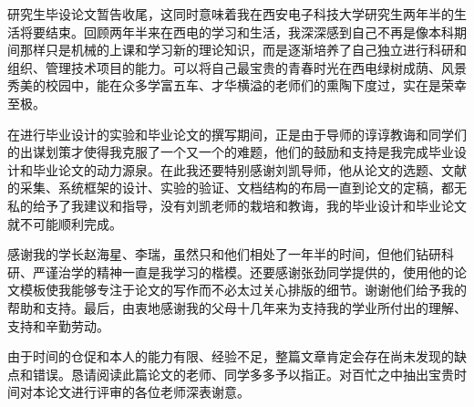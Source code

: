 
\begin{acknowledgments}

研究生毕设论文暂告收尾，这同时意味着我在西安电子科技大学研究生两年半的生活将要结束。回顾两年半来在西电的学习和生活，我深深感到自己不再是像本科期间那样只是机械的上课和学习新的理论知识，而是逐渐培养了自己独立进行科研和组织、管理技术项目的能力。可以将自己最宝贵的青春时光在西电绿树成荫、风景秀美的校园中，能在众多学富五车、才华横溢的老师们的熏陶下度过，实在是荣幸至极。

在进行毕业设计的实验和毕业论文的撰写期间，正是由于导师的谆谆教诲和同学们的出谋划策才使得我克服了一个又一个的难题，他们的鼓励和支持是我完成毕业设计和毕业论文的动力源泉。在此我还要特别感谢刘凯导师，他从论文的选题、文献的采集、系统框架的设计、实验的验证、文档结构的布局一直到论文的定稿，都无私的给予了我建议和指导，没有刘凯老师的栽培和教诲，我的毕业设计和毕业论文就不可能顺利完成。

感谢我的学长赵海星、李瑞，虽然只和他们相处了一年半的时间，但他们钻研科研、严谨治学的精神一直是我学习的楷模。还要感谢张劲同学提供的，使用他的论文模板使我能够专注于论文的写作而不必太过关心排版的细节。谢谢他们给予我的帮助和支持。最后，由衷地感谢我的父母十几年来为支持我的学业所付出的理解、支持和辛勤劳动。 

由于时间的仓促和本人的能力有限、经验不足，整篇文章肯定会存在尚未发现的缺点和错误。恳请阅读此篇论文的老师、同学多多予以指正。对百忙之中抽出宝贵时间对本论文进行评审的各位老师深表谢意。

\end{acknowledgments}

